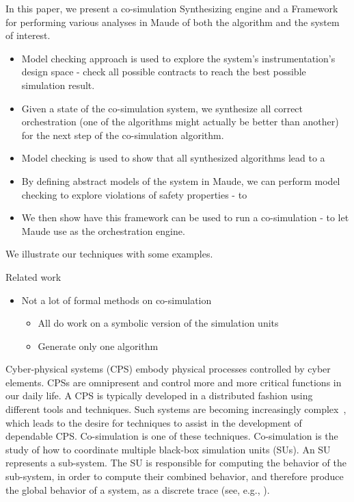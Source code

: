   In this paper, we present a co-simulation Synthesizing engine and a Framework for performing various analyses in Maude of both the algorithm and the system of interest.
  \begin{itemize}
    \item Model checking approach is used to explore the system's instrumentation's design space - check all possible contracts to reach the best possible simulation result.
    \item Given a state of the co-simulation system, we synthesize all correct orchestration (one of the algorithms might actually be better than another) for the next step of the co-simulation algorithm.
    \item Model checking is used to show that all synthesized algorithms lead to a  
    \item By defining abstract models of the system in Maude, we can perform model checking to explore violations of safety properties - to 
    \item We then show have this framework can be used to run a co-simulation - to let Maude use as the orchestration engine.
  \end{itemize}
  
  We illustrate our techniques with some examples.
  
  Related work
  \begin{itemize}
    \item Not a lot of formal methods on co-simulation
    \begin{itemize}
      \item All do work on a symbolic version of the simulation units
      \item Generate only one algorithm
    \end{itemize}
  \end{itemize}

Cyber-physical systems (CPS) embody physical processes controlled by cyber elements. 
CPSs are omnipresent and control more and more critical functions in our daily life.
A CPS is typically developed in a distributed fashion using different tools and techniques. 
Such systems are becoming increasingly complex~\cite{4519604}, which leads to the desire for techniques to assist in the development of dependable CPS.
Co-simulation is one of these techniques. Co-simulation is the study of how to coordinate multiple black-box simulation units (SUs).
An SU represents a sub-system. 
The SU is responsible for computing the behavior of the sub-system, in order to compute their combined behavior, and therefore produce the global behavior of a system, as a discrete trace (see, e.g., \cite{Kubler2000,Gomes2018}).

